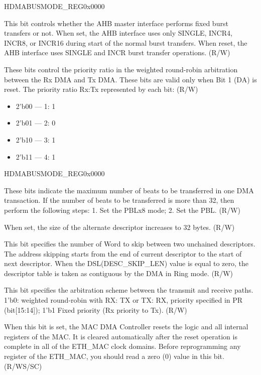 \begin{register}{H}{DMABUSMODE\_REG}{0x0000}
\begin{regdesc}
\begin{reglist}
\item [FIXED\_BURST]This bit controls whether the AHB master interface performs fixed burst transfers or not. When set, the AHB interface uses only SINGLE, INCR4, INCR8, or INCR16 during start of the normal burst transfers. When reset, the AHB interface uses SINGLE and INCR burst transfer operations. (R/W)
\item [PRI\_RATIO]These bits control the priority ratio in the weighted round-robin arbitration between the Rx DMA and Tx DMA. These bits are valid only when Bit 1 (DA) is reset. The priority ratio Rx:Tx represented by each bit: (R/W)
\begin{itemize}
\item 2'b00 —  1: 1
\item 2'b01 —  2: 0
\item 2'b10 —  3: 1
\item 2'b11 —  4: 1
\end{itemize}
\item [Continued on the next page...]
\end{reglist}\end{regdesc}
\end{register}

\addtocounter{Regfloat}{-1}
\begin{register}{H}{DMABUSMODE\_REG}{0x0000}
\begin{regdesc}\begin{reglist}
\item [Continued from the previous page...]
\item [PROG\_BURST\_LEN]These bits indicate the maximum number of beats to be transferred in one DMA transaction. If the number of beats to be transferred is more than 32, then perform the following steps: 1. Set the PBLx8 mode; 2. Set the PBL. (R/W)
\item [ALT\_DESC\_SIZE]When set, the size of the alternate descriptor increases to 32 bytes. (R/W)

\item [DESC\_SKIP\_LEN]This bit specifies the number of Word to skip between two unchained descriptors. The address skipping starts from the end of current descriptor to the start of next descriptor. When the DSL(DESC\_SKIP\_LEN) value is equal to zero, the descriptor table is taken as contiguous by the DMA in Ring mode. (R/W)
\item [DMA\_ARB\_SCH]This bit specifies the arbitration scheme between the transmit and receive paths. 1'b0: weighted round-robin with RX: TX or TX: RX, priority specified in PR (bit[15:14]); 1'b1 Fixed priority (Rx priority to Tx). (R/W)
\item [SW\_RST]When this bit is set, the MAC DMA Controller resets the logic and all internal registers of the MAC. It is cleared automatically after the reset operation is complete in all of the ETH\_MAC clock domains. Before reprogramming any register of the ETH\_MAC, you should read a zero (0) value in this bit. (R/WS/SC)
\end{reglist}\end{regdesc}
\end{register}


